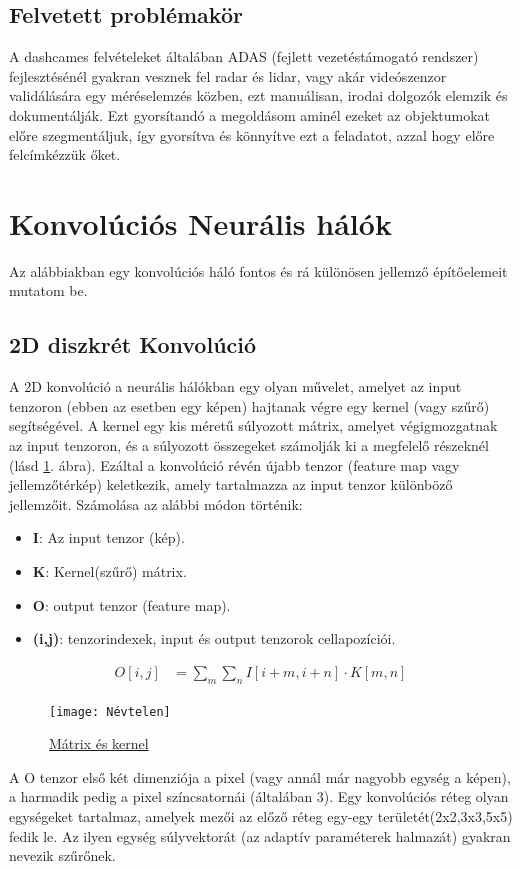 \documentclass[12pt,oneside,a4paper]{article}
\theoremstyle{remark}
\begin{document}
\subsection{Felvetett problémakör}\label{subsec:felvetett-problemakor}
A dashcames felvételeket általában ADAS (fejlett vezetéstámogató rendszer) fejlesztésénél gyakran vesznek fel radar és lidar,
vagy akár videószenzor validálására egy méréselemzés közben, ezt manuálisan, irodai dolgozók elemzik és dokumentálják.
Ezt gyorsítandó a megoldásom aminél ezeket az objektumokat előre szegmentáljuk, így gyorsítva és könnyítve ezt a feladatot,
azzal hogy előre felcímkézzük őket.

\section{Konvolúciós Neurális hálók}\label{sec:konvolucios-neuralis-halok}
Az alábbiakban egy konvolúciós háló fontos és rá különösen jellemző építőelemeit mutatom be.

\subsection{2D diszkrét Konvolúció}\label{subsec:2d-diszkret-konvolucio}

A 2D konvolúció a neurális hálókban egy olyan művelet, amelyet az input tenzoron (ebben az esetben egy képen) hajtanak
végre egy kernel (vagy szűrő) segítségével.
A kernel egy kis méretű súlyozott mátrix, amelyet végigmozgatnak az input tenzoron,
és a súlyozott összegeket számolják ki a megfelelő részeknél (lásd \ref{fig:Konvolucio}. ábra).
Ezáltal a konvolúció révén újabb tenzor (feature map vagy jellemzőtérkép) keletkezik, amely tartalmazza az input
tenzor különböző jellemzőit.
Számolása az alábbi módon történik:

\begin{itemize}
\item \textbf{I}: Az input tenzor (kép).
\item \textbf{K}: Kernel(szűrő) mátrix.
\item \textbf{O}: output tenzor (feature map).
\item \textbf{(i,j)}: tenzorindexek, input és output tenzorok cellapozíciói.
\end{itemize}
\vspace{3mm}
\begin{align}
O[i,j] &= \displaystyle\sum_{m} \sum_{n} I[i+m, i+n] \cdot K[m, n]
\end{align}
\begin{figure}[ht]
\centering
\texttt{[image: Névtelen]}
\caption{\label{fig:Konvolucio}
\href{https://towardsdatascience.com/intuitively-understanding-convolutions-for-deep-learning-1f6f42faee1}{Mátrix és kernel}}
\end{figure}
\vspace{3mm}
\noindent A O tenzor első két dimenziója a pixel (vagy annál már nagyobb egység a képen), a harmadik pedig a pixel
színcsatornái (általában 3).
Egy konvolúciós réteg olyan egységeket tartalmaz, amelyek mezői az előző réteg egy-egy területét(2x2,3x3,5x5) fedik le.
Az ilyen egység súlyvektorát (az adaptív paraméterek halmazát) gyakran nevezik szűrőnek.
\end{document}
